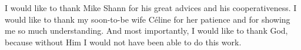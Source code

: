 \begin{acknowledgements}
I would like to thank Mike Shann for his great advices and his cooperativeness. I would like to thank my soon-to-be wife C\'{e}line for her patience and for showing me so much understanding. And most importantly, I would like to thank God, because without Him I would not have been able to do this work.
\end{acknowledgements}

